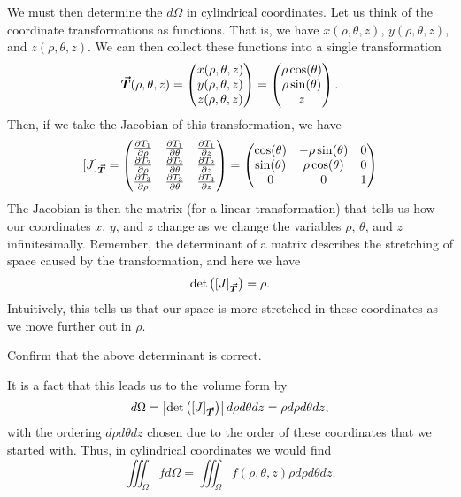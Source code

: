 We must then determine the  $d\Omega$ in cylindrical coordinates.  Let us think of the coordinate transformations as functions.  That is, we have $x(\rho,\theta,z)$, $y(\rho,\theta,z)$, and $z(\rho,\theta,z)$.  We can then collect these functions into a single transformation
\[
\boldsymbol{\vec{T}}(\rho,\theta,z) = \begin{pmatrix} x(\rho,\theta,z) \\ y(\rho,\theta,z) \\ z(\rho,\theta,z) \end{pmatrix} = \begin{pmatrix} \rho \cos(\theta) \\ \rho \sin(\theta) \\ z \end{pmatrix}.
\]
Then, if we take the Jacobian of this transformation, we have
\[
[J]_{\boldsymbol{\vec{T}}} = \begin{pmatrix} \frac{\partial T_1}{\partial \rho} & \frac{\partial T_1}{\partial \theta} & \frac{\partial T_1}{\partial z} \\ \frac{\partial T_2}{\partial \rho} & \frac{\partial T_2}{\partial \theta} & \frac{\partial T_2}{\partial z} \\ \frac{\partial T_3}{\partial \rho} & \frac{\partial T_3}{\partial \theta} & \frac{\partial T_3}{\partial z}  \end{pmatrix} =  \begin{pmatrix} \cos(\theta) & - \rho \sin(\theta) & 0 \\ \sin(\theta) & \rho \cos(\theta) & 0 \\ 0 & 0 & 1 \end{pmatrix}
\]
The Jacobian is then the matrix (for a linear transformation) that tells us how our coordinates $x$, $y$, and $z$ change as we change the variables $\rho$, $\theta$, and $z$ infinitesimally.  Remember, the determinant of a matrix describes the stretching of space caused by the transformation, and here we have
\[
\det \left( [J]_{\boldsymbol{\vec{T}}}\right) = \rho.
\]
Intuitively, this tells us that our space is more stretched in these coordinates as we move further out in $\rho$.

\begin{exercise}
Confirm that the above determinant is correct.
\end{exercise}

It is a fact that this leads us to the volume form by
\[
d\Omega = \left| \det \left([J]_{\boldsymbol{\vec{T}}}\right)\right|d\rho d\theta dz = \rho d\rho d\theta dz,
\]
with the ordering $d\rho d\theta dz$ chosen due to the order of these coordinates that we started with. Thus, in cylindrical coordinates we would find
\[
\iiint_\Omega f d\Omega = \iiint_\Omega f(\rho,\theta,z) \rho d\rho d\theta dz.
\]

